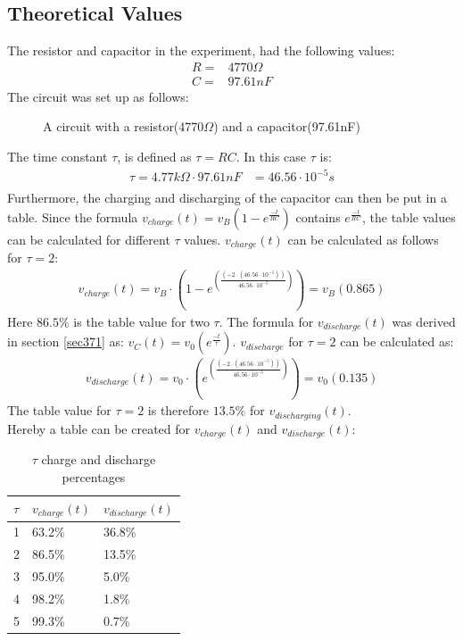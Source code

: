 \subsection{Theoretical Values}
The resistor and capacitor in the experiment, had the following values:
\begin{align*}
 R =& 4770\Omega \\
 C =& 97.61nF
\end{align*}
The circuit was set up as follows:
\begin{figure}[H]
	
	\caption{A circuit with a resistor(4770$\Omega$) and a capacitor(97.61nF)}
\end{figure}
\noindent The time constant $\tau$, is defined as $\tau = RC$. In this case $\tau$ is:
\begin{align*}
	\tau = 4.77 k\Omega \cdot 97.61 nF &= 46.56 \cdot 10^{-5} s \\
\end{align*}
Furthermore, the charging and discharging of the capacitor can then be put in a table. Since the formula $v_{charge}(t)=v_B(1-e^{\frac{-t}{RC}})$ contains $e^{\frac{-t}{RC}}$, the table values can be calculated for different $\tau$ values. $v_{charge}(t)$ can be calculated as follows for $\tau = 2$: 
\begin{align*}
v_{charge}(t)=v_{B} \cdot \left(1-e^{\left(\frac{\left(-2 \cdot \left(46.56 \cdot 10^{-5} \right)\right)}{46.56 \cdot 10^{-5}}\right)} \right) = v_{B}(0.865)
\end{align*}
Here $86.5\%$ is the table value for two $\tau$. The formula for $v_{discharge}(t)$ was derived in section \ref{sec371} as: $v_{C}(t)=v_{0} \left(e^{\frac{-t}{\tau}} \right)$. $v_{discharge}$ for $\tau = 2$ can be calculated as:
\begin{align*}
v_{discharge}(t)=v_{0} \cdot \left(e^{\left(\frac{\left(-2 \cdot \left(46.56 \cdot 10^{-5} \right)\right)}{46.56 \cdot 10^{-5}}\right)} \right) = v_{0}(0.135)
\end{align*}
The table value for $\tau = 2$ is therefore $13.5 \%$ for $v_{discharging}(t)$. \\
Hereby a table can be created for $v_{charge}(t)$ and $v_{discharge}(t)$: \\
\begin{table}[H]
\center
\begin{tabular}{|l|l|l|}
\hline
$\tau$ & $v_{charge}(t)$ & $v_{discharge}(t)$ \\ \hline
1      & 63.2\%       & 36.8\%         \\ \hline
2      & 86.5\%       & 13.5\%         \\ \hline
3      & 95.0\%       & 5.0\%          \\ \hline
4      & 98.2\%       & 1.8\%          \\ \hline
5      & 99.3\%       & 0.7\%          \\ \hline
\end{tabular}
\caption{$\tau$ charge and discharge percentages}
\end{table}
